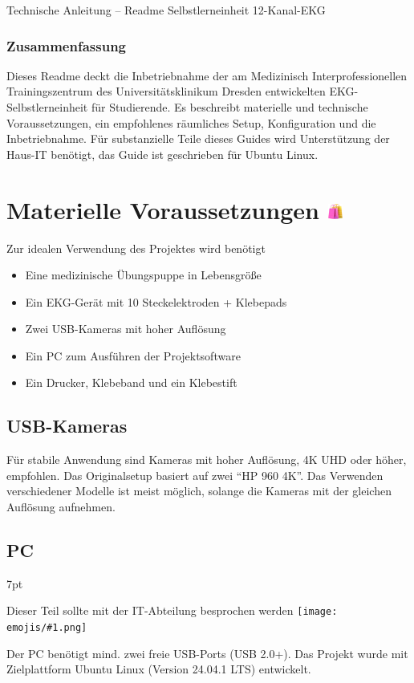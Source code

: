 \documentclass[a4paper, 10pt]{article}
\newcommand{\emoji}[1]{
    \begingroup\normalfont
    \texttt{[image: emojis/\#1.png]}
    \endgroup
}
\newenvironment{formal}{%
\small
\vspace*{-4mm}
    \def\FrameCommand{%
    \hspace{1pt}%
    {\color{formalpipe}\vrule width 0.7mm}%
    {\color{formalshade}\vrule width 1.5mm}%
    \colorbox{formalshade}%
    }%
    \MakeFramed{\advance\hsize-\width\FrameRestore}%
    \noindent%
    \begin{adjustwidth}{}{7pt}%
    \vspace{2pt}\vspace{2pt}%
}
{%
    \vspace{2pt}\end{adjustwidth}\endMakeFramed%
}
\begin{document}
{ \Huge \noindent Technische Anleitung -- Readme} \newline
{ \LARGE \noindent Selbstlerneinheit 12-Kanal-EKG}

\subsubsection*{Zusammenfassung}
Dieses Readme deckt die Inbetriebnahme der am Medizinisch Interprofessionellen Trainingszentrum des Universitätsklinikum Dresden entwickelten EKG-Selbstlerneinheit für Studierende. Es beschreibt materielle und technische Voraussetzungen, ein empfohlenes räumliches Setup, Konfiguration und die Inbetriebnahme.
Für substanzielle Teile dieses Guides wird Unterstützung der Haus-IT benötigt, das Guide ist geschrieben für Ubuntu Linux.

\section{Materielle Voraussetzungen {\includegraphics[height=0.65em]{emojis/shopping-bags.png}}}
\label{sec:prerequisites}
Zur idealen Verwendung des Projektes wird benötigt
\begin{itemize}
    \item Eine medizinische Übungspuppe in Lebensgröße
    \item Ein EKG-Gerät mit 10 Steckelektroden + Klebepads
    \item Zwei USB-Kameras mit hoher Auflösung
    \item Ein PC zum Ausführen der Projektsoftware
    \item Ein Drucker, Klebeband und ein Klebestift
\end{itemize}

\subsection{USB-Kameras}
\label{ssec:cameras}
Für stabile Anwendung sind Kameras mit hoher Auflösung, 4K UHD oder höher, empfohlen. Das Originalsetup basiert auf zwei \enquote{HP 960 4K}. Das Verwenden verschiedener Modelle ist meist möglich, solange die Kameras mit der gleichen Auflösung aufnehmen.


\subsection{PC}
\label{ssec:pc-reqs}
\begin{formal}
    Dieser Teil sollte mit der IT-Abteilung besprochen werden\emoji{technologist}
\end{formal}
Der PC benötigt mind. zwei freie USB-Ports (USB 2.0+). Das Projekt wurde mit Zielplattform Ubuntu Linux (Version 24.04.1 LTS) entwickelt.
\end{document}
